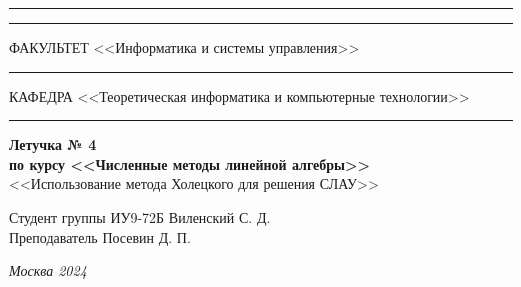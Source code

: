 \documentclass[a4paper, 14pt]{extarticle}
\begin{document}
\begin{titlepage}
\vspace{-25pt}
\hspace{-35pt}\rule{\textwidth}{2.3pt}

\vspace*{-20.3pt}
\hspace{-35pt}\rule{\textwidth}{0.4pt}

\vspace{1.5ex}
\hspace{-35pt} \noindent \small ФАКУЛЬТЕТ\hspace{80pt} <<Информатика и системы управления>>

\vspace*{-16pt}
\hspace{47pt}\rule{0.83\textwidth}{0.4pt}

\vspace{0.5ex}
\hspace{-35pt} \noindent \small КАФЕДРА\hspace{50pt} <<Теоретическая информатика и компьютерные технологии>>

\vspace*{-16pt}
\hspace{30pt}\rule{0.866\textwidth}{0.4pt}
  
\vspace{11em}

\begin{center}
\Large {\bf Летучка № 4} \\ 
\large {\bf по курсу <<Численные методы линейной алгебры>>} \\
\large <<Использование метода Холецкого для решения СЛАУ>> 
\end{center}\normalsize

\vspace{8em}


\begin{flushright}
  {Студент группы ИУ9-72Б Виленский С. Д. \hspace*{15pt}\\ 
  \vspace{2ex}
  Преподаватель Посевин Д. П.\hspace*{15pt}}
\end{flushright}

\bigskip

\vfill
 

\begin{center}
\textsl{Москва 2024}
\end{center}
\end{titlepage}
\end{document}
